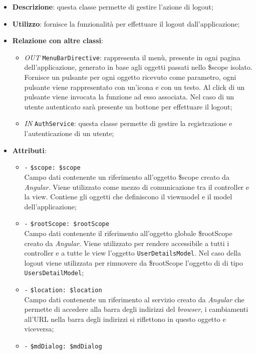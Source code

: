 \begin{itemize}
	\item \textbf{Descrizione}: questa classe permette di gestire l'azione di logout;
	\item \textbf{Utilizzo}: fornisce la funzionalità per effettuare il logout dall'applicazione;
	\item \textbf{Relazione con altre classi}:
	\begin{itemize}
		\item \textit{OUT} \texttt{MenuBarDirective}: rappresenta il menù, presente in ogni pagina dell'applicazione, generato in base agli oggetti passati nello \$scope isolato. Fornisce un pulsante per ogni oggetto ricevuto come parametro, ogni pulsante viene rappresentato con un’icona e con un testo. Al click di un pulsante viene invocata la funzione ad esso associata. Nel caso di un utente autenticato sarà presente un bottone per effettuare il logout;
		\item \textit{IN} \texttt{AuthService}: questa classe permette di gestire la registrazione e l'autenticazione di un utente;
	\end{itemize}
	\item \textbf{Attributi}:
	\begin{itemize}
		\item \texttt{-} \texttt{\$scope: \$scope} \\
		Campo dati contenente un riferimento all’oggetto \$scope creato da \textit{Angular}. Viene utilizzato come mezzo di comunicazione tra il controller e la view. Contiene gli oggetti che definiscono il viewmodel e il model dell’applicazione;
		\item \texttt{-} \texttt{\$rootScope: \$rootScope} \\
		Campo dati contenente il riferimento all'oggetto globale \$rootScope creato da \textit{Angular}. Viene utilizzato per rendere accessibile a tutti i controller e a tutte le view l'oggetto \texttt{UserDetailsModel}. Nel caso della logout viene utilizzata per rimuovere da \$rootScope l'oggetto di di tipo \texttt{UsersDetailModel};
		\item \texttt{-} \texttt{\$location: \$location} \\
		Campo dati contenente un riferimento al servizio creato da \textit{Angular} che permette di accedere alla barra degli indirizzi del \textit{browser}, i cambiamenti all’URL nella barra degli indirizzi si riflettono in questo oggetto e viceversa;
		\item \texttt{-} \texttt{\$mdDialog: \$mdDialog} \\

\end{itemize}
\end{itemize}
